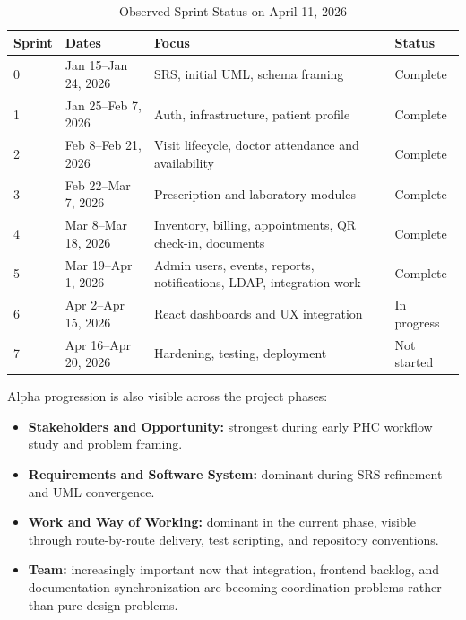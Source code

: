 \documentclass[conference]{IEEEtran}
\begin{document}
\begin{table}[!t]
\centering
\caption{Observed Sprint Status on April 11, 2026}
\begin{tabular}{|p{0.9cm}|p{2.3cm}|p{3.0cm}|p{1.2cm}|}
\hline
\textbf{Sprint} & \textbf{Dates} & \textbf{Focus} & \textbf{Status} \\
\hline
0 & Jan 15--Jan 24, 2026 & SRS, initial UML, schema framing & Complete \\
\hline
1 & Jan 25--Feb 7, 2026 & Auth, infrastructure, patient profile & Complete \\
\hline
2 & Feb 8--Feb 21, 2026 & Visit lifecycle, doctor attendance and availability & Complete \\
\hline
3 & Feb 22--Mar 7, 2026 & Prescription and laboratory modules & Complete \\
\hline
4 & Mar 8--Mar 18, 2026 & Inventory, billing, appointments, QR check-in, documents & Complete \\
\hline
5 & Mar 19--Apr 1, 2026 & Admin users, events, reports, notifications, LDAP, integration work & Complete \\
\hline
6 & Apr 2--Apr 15, 2026 & React dashboards and UX integration & In progress \\
\hline
7 & Apr 16--Apr 20, 2026 & Hardening, testing, deployment & Not started \\
\hline
\end{tabular}
\label{tab:sprints}
\end{table}

Alpha progression is also visible across the project phases:
\begin{itemize}
    \item \textbf{Stakeholders and Opportunity:} strongest during early PHC workflow study and problem framing.
    \item \textbf{Requirements and Software System:} dominant during SRS refinement and UML convergence.
    \item \textbf{Work and Way of Working:} dominant in the current phase, visible through route-by-route delivery, test scripting, and repository conventions.
    \item \textbf{Team:} increasingly important now that integration, frontend backlog, and documentation synchronization are becoming coordination problems rather than pure design problems.
\end{itemize}
\end{document}
